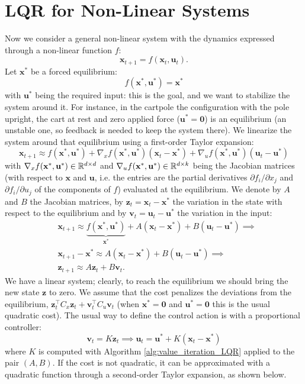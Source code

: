 \documentclass[10pt, a4paper]{report}
\begin{document}
\section{LQR for Non-Linear Systems}
Now we consider a general non-linear system with the dynamics expressed through a non-linear function $f$:\begin{equation}
    \mathbf x_{t+1}=f(\mathbf x_t,\mathbf u_t).
\end{equation}
Let $\mathbf x^*$ be a forced equilibrium:\begin{equation}
    f(\mathbf x^*,\mathbf u^*)=\mathbf x^*
\end{equation}
with $\mathbf u^*$ being the required input: this is the goal, and we want to stabilize the system around it. For instance, in the cartpole the configuration with the pole upright, the cart at rest and zero applied force ($\mathbf u^*=\mathbf 0$) is an equilibrium (an unstable one, so feedback is needed to keep the system there). We linearize the system around that equilibrium using a first-order Taylor expansion:\begin{equation}
    \mathbf x_{t+1}\approx f(\mathbf x^*,\mathbf u^*)+\nabla_x f(\mathbf x^*,\mathbf u^*)(\mathbf x_t-\mathbf x^* )+\nabla_u f(\mathbf x^*,\mathbf u^*)(\mathbf u_t-\mathbf u^* )
\end{equation}
with $\nabla_x f(\mathbf x^*,\mathbf u^*)\in{\mathbb R}^{d\times d}$ and $\nabla_u f(\mathbf x^*,\mathbf u^*)\in{\mathbb R}^{d\times k}$ being the Jacobian matrices (with respect to $\mathbf x$ and $\mathbf u$, i.e. the entries are the partial derivatives $\partial f_i/\partial x_j$ and $\partial f_i/\partial u_j$ of the components of $f$) evaluated at the equilibrium. We denote by $A$ and $B$ the Jacobian matrices, by $\mathbf z_t=\mathbf x_t-\mathbf x^*$ the variation in the state with respect to the equilibrium and by $\mathbf v_t=\mathbf u_t-\mathbf u^*$ the variation in the input:
\begin{align}
    &\mathbf x_{t+1}\approx \underbrace {f(\mathbf x^*,\mathbf u^*)}_{\mathbf x^*}+A(\mathbf x_t-\mathbf x^* )+B(\mathbf u_t-\mathbf u^* )\implies \\ 
    &\mathbf x_{t+1}-\mathbf x^*\approx 
    A(\mathbf x_t-\mathbf x^* )+B(\mathbf u_t-\mathbf u^* )\implies \\
    &\mathbf z_{t+1}\approx A\mathbf z_t+B\mathbf v_t.
\end{align}
We have a linear system; clearly, to reach the equilibrium we should bring the new state $\mathbf z$ to zero. We assume that the cost penalizes the deviations from the equilibrium, $\mathbf z_t^\top C_x\mathbf z_t+\mathbf v_t^\top C_u\mathbf v_t$ (when $\mathbf x^*=\mathbf 0$ and $\mathbf u^*=\mathbf 0$ this is the usual quadratic cost). 
The usual way to define the control action is with a proportional controller:\begin{equation}
    \mathbf v_t=K\mathbf z_t\implies \mathbf u_t=\mathbf u^*+K(\mathbf x_t-\mathbf x^*)
\end{equation}
where $K$ is computed with Algorithm \ref{alg:value_iteration_LQR} applied to the pair $(A,B)$. If the cost is not quadratic, it can be approximated with a quadratic function through a second-order Taylor expansion, as shown below.
\end{document}
